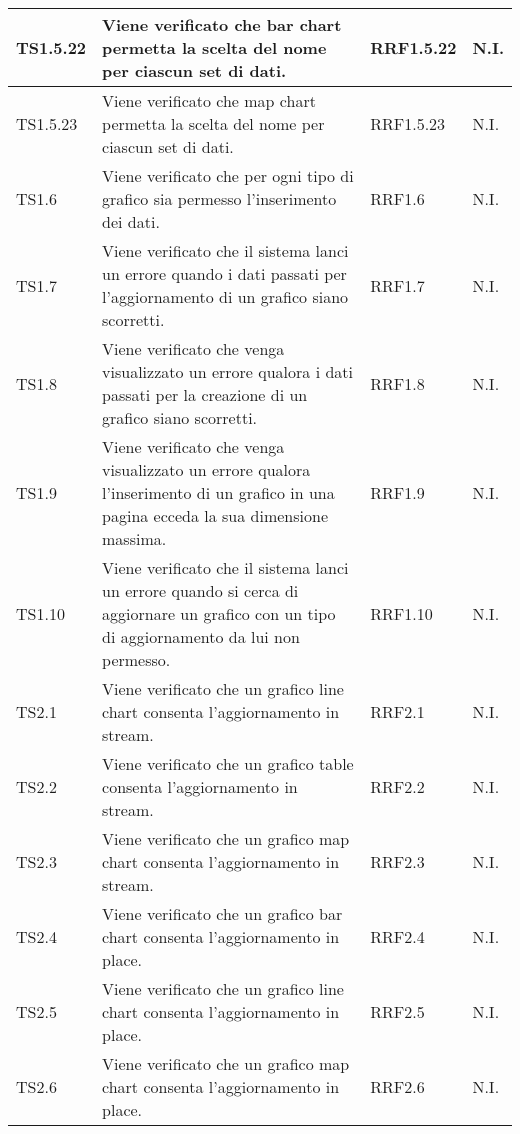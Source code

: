 \begin{longtabu}{| X[0.5] | X | X[0.5] | X[0.4] |}
TS1.5.22 &	Viene verificato che bar chart permetta la scelta del nome per ciascun set di dati. & RRF1.5.22 & N.I.\\ \hline

TS1.5.23 &	Viene verificato che map chart permetta la scelta del nome per ciascun set di dati. & RRF1.5.23 & N.I.\\ \hline

TS1.6 & Viene verificato che per ogni tipo di grafico sia permesso l'inserimento dei dati. & RRF1.6 & N.I.\\ \hline

TS1.7 & Viene verificato che il sistema lanci un errore quando i dati passati per l'aggiornamento di un grafico siano scorretti. & RRF1.7 & N.I.\\ \hline

TS1.8 & Viene verificato che venga visualizzato un errore qualora i dati passati per la creazione di un grafico siano scorretti. & RRF1.8 & N.I.\\ \hline

TS1.9 & Viene verificato che venga visualizzato un errore qualora l'inserimento di un grafico in una pagina ecceda la sua dimensione massima. & RRF1.9 & N.I.\\ \hline

TS1.10 & Viene verificato che il sistema lanci un errore quando si cerca di aggiornare un grafico con un tipo di aggiornamento da lui non permesso. & RRF1.10 & N.I.\\ \hline

TS2.1 & Viene verificato che un grafico line chart consenta l'aggiornamento in stream. & RRF2.1 & N.I.\\ \hline

TS2.2 & Viene verificato che un grafico table consenta l'aggiornamento in stream. & RRF2.2 & N.I.\\ \hline

TS2.3 & Viene verificato che un grafico map chart consenta l'aggiornamento in stream. & RRF2.3 & N.I.\\ \hline

TS2.4 & Viene verificato che un grafico bar chart consenta l'aggiornamento in place. & RRF2.4 & N.I.\\ \hline

TS2.5 & Viene verificato che un grafico line chart consenta l'aggiornamento in place. & RRF2.5 & N.I.\\ \hline

TS2.6 & Viene verificato che un grafico map chart consenta l'aggiornamento in place. & RRF2.6 & N.I.\\ \hline


\end{longtabu}
